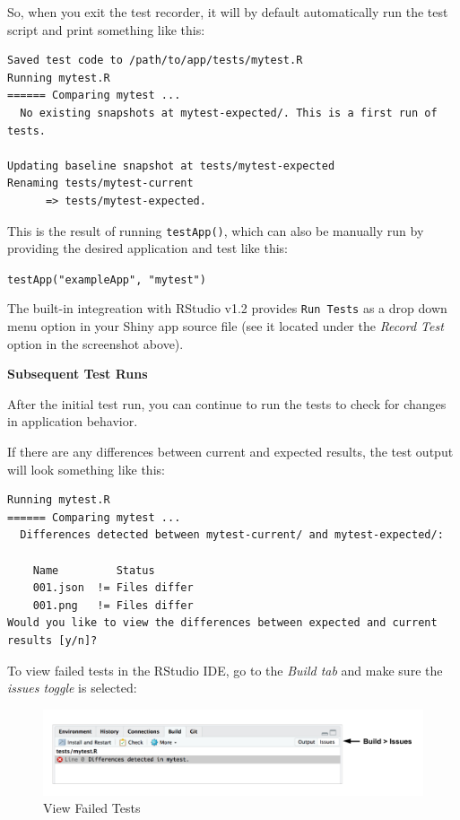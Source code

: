 \documentclass[]{book}
\theoremstyle{definition}
\theoremstyle{definition}
\theoremstyle{definition}
\theoremstyle{remark}
\begin{document}
So, when you exit the test recorder, it will by default automatically
run the test script and print something like this:

\begin{verbatim}
Saved test code to /path/to/app/tests/mytest.R
Running mytest.R 
====== Comparing mytest ...
  No existing snapshots at mytest-expected/. This is a first run of tests.

Updating baseline snapshot at tests/mytest-expected
Renaming tests/mytest-current
      => tests/mytest-expected.
\end{verbatim}

This is the result of running \texttt{testApp()}, which can also be
manually run by providing the desired application and test like this:

\texttt{testApp("exampleApp",\ "mytest")}

The built-in integreation with RStudio v1.2 provides \texttt{Run\ Tests}
as a drop down menu option in your Shiny app source file (see it located
under the \emph{Record Test} option in the screenshot above).

\textbf{Subsequent Test Runs}

After the initial test run, you can continue to run the tests to check
for changes in application behavior.

If there are any differences between current and expected results, the
test output will look something like this:

\begin{verbatim}
Running mytest.R 
====== Comparing mytest ...
  Differences detected between mytest-current/ and mytest-expected/:

    Name         Status      
    001.json  != Files differ
    001.png   != Files differ
Would you like to view the differences between expected and current results [y/n]? 
\end{verbatim}

To view failed tests in the RStudio IDE, go to the \emph{Build tab} and
make sure the \emph{issues toggle} is selected:

\begin{figure}
\centering
\includegraphics{imgs/testing/failed_tests.png}
\caption{View Failed Tests}
\end{figure}
\end{document}
